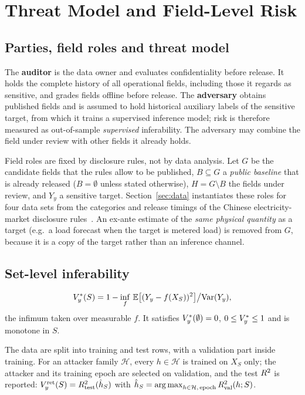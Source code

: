 \section{Threat Model and Field-Level Risk}\label{sec:problem}\label{sec:mk}

\subsection{Parties, field roles and threat model}
The \textbf{auditor} is the data owner and evaluates confidentiality before release. It holds the complete history of all operational
fields, including those it regards as sensitive, and grades fields offline before release.
The \textbf{adversary} obtains published fields and is assumed to hold historical auxiliary
labels of the sensitive target, from which it trains a supervised inference model; risk is
therefore measured as out-of-sample \emph{supervised} inferability. The adversary may combine
the field under review with other fields it already holds.

Field roles are fixed by disclosure rules, not by data analysis. Let $G$ be the candidate
fields that the rules allow to be published, $B\subseteq G$ a \emph{public baseline} that is
already released ($B=\emptyset$ unless stated otherwise), $H=G\setminus B$ the fields under
review, and $Y_y$ a sensitive target. Section~\ref{sec:data} instantiates these roles for
four data sets from the categories and release timings of the Chinese electricity-market
disclosure rules~\cite{nea2024disclosure}. An ex-ante estimate of the \emph{same physical
quantity} as a target (e.g.\ a load forecast when the target is metered load) is removed from
$G$, because it is a copy of the target rather than an inference channel.

\subsection{Set-level inferability}
\begin{definition}
\[
V_y^{*}(S) = 1 - \inf_{f}\,\mathbb{E}\big[(Y_y - f(X_S))^{2}\big] \big/ \mathrm{Var}(Y_y),
\]
the infimum taken over measurable $f$. It satisfies $V_y^{*}(\emptyset)=0$, $0 \le V_y^{*} \le 1$
and is monotone in $S$.
\end{definition}

\begin{definition}\label{def:vret}
The data are split into training and test rows, with a validation part inside training. For
an attacker family $\mathcal{H}$, every $h\in\mathcal{H}$ is trained on $X_S$ only; the
attacker and its training epoch are selected on validation, and the test $R^2$ is reported:
$V_y^{\mathrm{ret}}(S) = R^2_{\mathrm{test}}(\hat h_S)$ with
$\hat h_S = \operatorname*{arg\,max}_{h \in \mathcal{H},\,\mathrm{epoch}} R^2_{\mathrm{val}}(h;S)$.
\end{definition}

